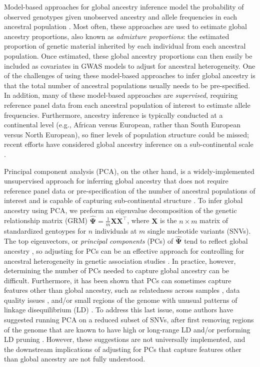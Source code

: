 \documentclass[12pt]{article}
\begin{document}
Model-based approaches for global ancestry inference model the probability of observed genotypes given unobserved ancestry and allele frequencies in each ancestral population \citep{structure, tang2005, admixture, finestructure}. 
Most often, these approaches are used to estimate global ancestry proportions, also known as \textit{admixture proportions}: the estimated proportion of genetic material inherited by each individual from each ancestral population. 
Once estimated, these global ancestry proportions can then easily be included as covariates in GWAS models to adjust for ancestral heterogeneity.
One of the challenges of using these model-based approaches to infer global ancestry is that the total number of ancestral populations usually needs to be pre-specified. 
In addition, many of these model-based approaches are \textit{supervised}, requiring reference panel data from each ancestral population of interest to estimate allele frequencies.
Furthermore, ancestry inference is typically conducted at a continental level (e.g., African versus European, rather than South European versus North European), so finer levels of population structure could be missed; recent efforts have considered global ancestry inference on a sub-continental scale \citep{finestructure, durand2014}.

Principal component analysis (PCA), on the other hand, is a widely-implemented unsupervised approach for inferring global ancestry that does not require reference panel data or pre-specification of the number of ancestral populations of interest and is capable of capturing sub-continental structure \citep{novembre2008}. 
To infer global ancestry using PCA, we preform an eigenvalue decomposition of the genetic relationship matrix (GRM) $\hat{\boldsymbol\Psi} = \frac{1}{m} \mathbf{X} \mathbf{X}^\top$, where $\mathbf{X}$ is the $n \times m$ matrix of standardized gentoypes for $n$ individuals at $m$ single nucleotide variants (SNVs).
The top eigenvectors, or \textit{principal components} (PCs) of $\hat{\boldsymbol\Psi}$ tend to reflect global ancestry \citep{patterson2006, mcvean2009}, so adjusting for PCs can be an effective approach for controlling for ancestral heterogeneity in genetic association studies \citep{eigenstrat}. 
In practice, however, determining the number of PCs needed to capture global ancestry can be difficult. 
Furthermore, it has been shown that PCs can sometimes capture features other than global ancestry, such as relatedness across samples \citep{patterson2006, conomos2015}, data quality issues \citep{eigenstrat, weale2010}, and/or small regions of the genome with unusual patterns of linkage disequilibrium (LD) \citep{tian2008, price2008}. 
To address this last issue, some authors have suggested running PCA on a reduced subset of SNVs, after first removing regions of the genome that are known to have high or long-range LD \citep{price2008} and/or performing LD pruning \citep{anderson2010, abdellaoui2013}. 
However, these suggestions are not universally implemented, and the downstream implications of adjusting for PCs that capture features other than global ancestry are not fully understood.
\end{document}
